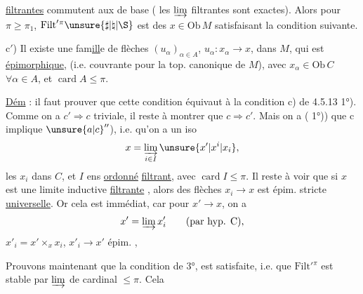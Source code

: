 \uline{filtrantes} commutent aux  de base ( les $\varinjlim$ filtrantes sont exactes). Alors pour  $\pi\geq\pi_1$, $\mathrm{Filt}'{}^\pi\unsure{\sharp|\natural|\S}$ est  des $x\in\mathrm{Ob}\,M$ satisfaisant la condition suivante.

c$'$) Il existe une fam\uline{ill}e de flèches $(u_\alpha)_{\alpha\in A}$, $u_\alpha:x_\alpha\longrightarrow x$, dans $M$, qui est \uline{épimorphique}, \uline{ } (i.e. couvrante pour la top. canonique de $M$), avec $x_\alpha\in\mathrm{Ob}\,C$ $\forall\alpha\in A$, et $\operatorname{card}A\leq\pi$.

\uline{Dém} : il faut prouver que cette condition équivaut à la condition c) de 4.5.13 1°). Comme on a $c'\Rightarrow c$ triviale, il reste à montrer que $c\Rightarrow c'$. Mais on a  ( 1°)) que c implique $\unsure{a|c}''$), i.e. qu'on a un iso
\[
x=\varinjlim_{i\in I}\unsure{x'|x^i|x_i},
\]
les $x_i$ dans $C$, et $I$ ens \uline{ordonné} \uline{filtrant}, avec $\operatorname{card}I\leq\pi$. Il reste à voir que si $x$ est  une limite inductive \uline{filtrante} , alors  des flèches $x_i\longrightarrow x$ est épim. stricte \uline{universelle}. Or cela est immédiat, car pour $x'\longrightarrow x$, on a
\[
x'=\varinjlim x'_i\qquad\text{(par hyp. C)},
\]
 $x'_i=x'\times_x x_i$,   $x'_i\longrightarrow x'$  épim. , 

Prouvons maintenant que  la condition de 3°,  est satisfaite, i.e. que $\mathrm{Filt}'{}^\pi$ est stable par $\varinjlim$ de cardinal $\leq\pi$. Cela
